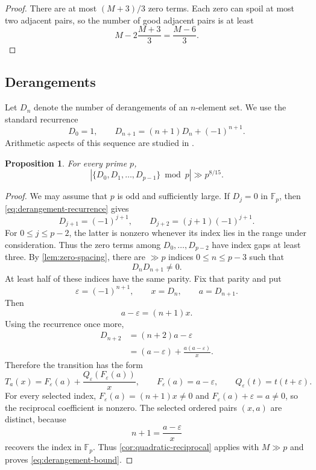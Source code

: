 \documentclass[11pt,reqno]{amsart}
\numberwithin{equation}{section}
\newtheorem{proposition}[proposition]{Proposition}
\theoremstyle{definition}
\theoremstyle{remark}
\newcommand{\F}{\mathbb F}
\begin{document}
\begin{proof}
There are at most $(M+3)/3$ zero terms.  Each zero can spoil at most two adjacent pairs, so the number of good adjacent pairs is at least
\[
  M-2\frac{M+3}{3}=\frac{M-6}{3}.
\]
\end{proof}

\subsection{Derangements}

Let $D_n$ denote the number of derangements of an $n$-element set.  We use the standard recurrence
\begin{equation}\label{eq:derangement-recurrence}
  D_0=1,
  \qquad
  D_{n+1}=(n+1)D_n+(-1)^{n+1}.
\end{equation}
Arithmetic aspects of this sequence are studied in \cite{SunZagier2011,Miska2016}.

\begin{proposition}\label{prop:derangements}
For every prime $p$,
\begin{equation}\label{eq:derangement-bound}
  \left|\{D_0,D_1,\ldots,D_{p-1}\}\bmod p\right|
  \gg p^{8/15}.
\end{equation}
\end{proposition}

\begin{proof}
We may assume that $p$ is odd and sufficiently large.  If $D_j=0$ in $\F_p$, then \eqref{eq:derangement-recurrence} gives
\[
  D_{j+1}=(-1)^{j+1},
  \qquad
  D_{j+2}=(j+1)(-1)^{j+1}.
\]
For $0\le j\le p-2$, the latter is nonzero whenever its index lies in the range under consideration.  Thus the zero terms among $D_0,\ldots,D_{p-2}$ have index gaps at least three.  By \cref{lem:zero-spacing}, there are $\gg p$ indices $0\le n\le p-3$ such that
\[
  D_nD_{n+1}\ne0.
\]
At least half of these indices have the same parity.  Fix that parity and put
\[
  \varepsilon=(-1)^{n+1},
  \qquad
  x=D_n,
  \qquad
  a=D_{n+1}.
\]
Then
\[
  a-\varepsilon=(n+1)x.
\]
Using the recurrence once more,
\begin{align*}
  D_{n+2}
  &=(n+2)a-\varepsilon\\
  &=(a-\varepsilon)+\frac{a(a-\varepsilon)}{x}.
\end{align*}
Therefore the transition has the form
\[
  T_a(x)=F_\varepsilon(a)+\frac{Q_\varepsilon(F_\varepsilon(a))}{x},
  \qquad
  F_\varepsilon(a)=a-\varepsilon,
  \qquad
  Q_\varepsilon(t)=t(t+\varepsilon).
\]
For every selected index, $F_\varepsilon(a)=(n+1)x\ne0$ and $F_\varepsilon(a)+\varepsilon=a\ne0$, so the reciprocal coefficient is nonzero.  The selected ordered pairs $(x,a)$ are distinct, because
\[
  n+1=\frac{a-\varepsilon}{x}
\]
recovers the index in $\F_p$.  Thus \cref{cor:quadratic-reciprocal} applies with $M\gg p$ and proves \eqref{eq:derangement-bound}.
\end{proof}
\end{document}
